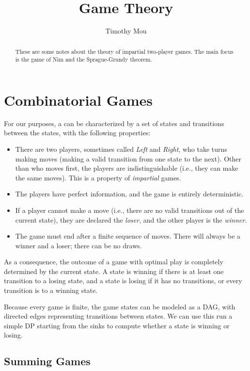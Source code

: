 \documentclass[11pt]{scrartcl}
\begin{document}
\title{Game Theory}
\author{Timothy Mou}
\maketitle

\tableofcontents

\begin{abstract}
  These are some notes about the theory of impartial two-player games.
  The main focus is the game of Nim and the Sprague-Grundy theorem.
\end{abstract}

\section{Combinatorial Games}

\begin{definition}
  For our purposes, a  can be characterized by a set of states and transitions between the states, with the following properties:
  \begin{itemize}
    \item There are two players, sometimes called \textit{Left} and \textit{Right}, who take turns making moves (making a valid transition from one state to the next).
    Other than who moves first, the players are indistinguishable (i.e., they can make the same moves).
      This is a property of \textit{impartial} games.
   \item The players have perfect information, and the game is entirely deterministic.
   \item If a player cannot make a move (i.e., there are no valid transitions out of the current state), they are declared the \textit{loser}, and the other player is the \textit{winner}.
    \item The game must end after a finite sequence of moves.
      There will always be a winner and a loser; there can be no draws.
  \end{itemize}

  As a consequence, the outcome of a game with optimal play is completely determined by the current state.
  A state is winning if there is at least one transition to a losing state, and a state is losing if it has no transitions, or every transition is to a winning state.

  Because every game is finite, the game states can be modeled as a DAG, with directed edges representing transitions between states.
  We can use this run a simple DP starting from the sinks to compute whether a state is winning or losing.

  \subsection{Summing Games}


\end{definition}
\end{document}

